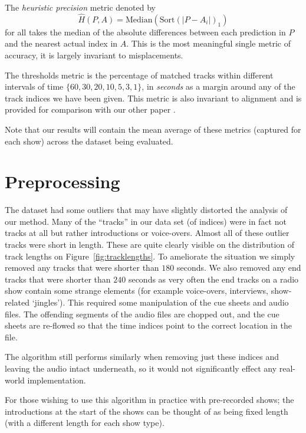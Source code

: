 \documentclass[twocolumn]{article}
\begin{document}
The \textit{heuristic precision} metric denoted by 
\[
\hat H(P,A) =  \mathrm{Median}\left(    \mathrm{Sort}\left( |P-A_i|\right)_1 \right)
\] for all
 takes the median of the absolute differences between each prediction in $P$ and the nearest actual index in $A$. This is the most meaningful single metric of accuracy, it is largely invariant to misplacements.
 
 The thresholds metric is the percentage of matched tracks within different intervals of time $\{60, 30, 20, 10, 5, 3, 1\}$, in \emph{seconds} as a margin around any of the track indices we have been given. This metric is also invariant to alignment and is provided for comparison with our other paper \cite{scarfe2013long}.
 
 Note that our results will contain the mean average of these metrics (captured for each show) across the dataset being evaluated. 

\section{Preprocessing}\label{proprocessing} %

The dataset had some outliers that may have slightly distorted the analysis of our method. Many of the ``tracks'' in our data set (of indices) were in fact not tracks at all but rather introductions or voice-overs. Almost all of these outlier tracks were short in length. These are quite clearly visible on the distribution of track lengths on Figure~\ref{fig:tracklengths}. To ameliorate the situation we simply removed any tracks that were shorter than $180$ seconds. We also removed any end tracks that were shorter than $240$ seconds as very often the end tracks on a radio show contain some strange elements (for example voice-overs, interviews, show-related `jingles'). This required some manipulation of the cue sheets and audio files. The offending segments of the audio files are chopped out, and the cue sheets are re-flowed so that the time indices point to the correct location in the file. 

The algorithm still performs similarly when removing just these indices and leaving the audio intact underneath, so it would not significantly effect any real-world implementation. 

 For those wishing to use this algorithm in practice with pre-recorded shows; the introductions at the start of the shows can be thought of as being fixed length (with a different length for each show type).
\end{document}
